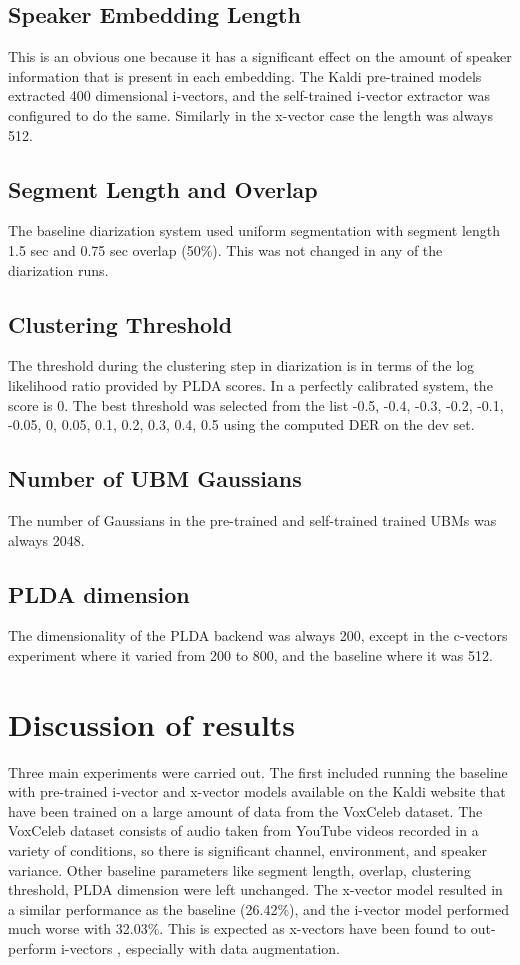 		\subsection{Speaker Embedding Length}
			This is an obvious one because it has a significant effect on the amount of speaker information that is present in each embedding. The Kaldi pre-trained models extracted 400 dimensional i-vectors, and the self-trained i-vector extractor was configured to do the same. Similarly in the x-vector case the length was always 512.
		\subsection{Segment Length and Overlap}
		The baseline diarization system used uniform segmentation with segment length 1.5 sec and 0.75 sec overlap (50\%). This was not changed in any of the diarization runs.
		\subsection{Clustering Threshold}
		The threshold during the clustering step in diarization is in terms of the log likelihood ratio provided by PLDA scores. In a perfectly calibrated system, the score is 0. The best threshold was selected from the list -0.5, -0.4, -0.3, -0.2, -0.1, -0.05, 0, 0.05, 0.1, 0.2, 0.3, 0.4, 0.5 using the computed DER on the dev set.
		\subsection{Number of UBM Gaussians}
		The number of Gaussians in the pre-trained and self-trained trained UBMs was always 2048.
		\subsection{PLDA dimension}
		The dimensionality of the PLDA backend was always 200, except in the c-vectors experiment where it varied from 200 to 800, and the baseline where it was 512.

	\section{Discussion of results}
		Three main experiments were carried out. The first included running the baseline with pre-trained i-vector and x-vector models available on the Kaldi website that have been trained on a large amount of data from the VoxCeleb dataset. The VoxCeleb dataset consists of audio taken from YouTube videos recorded in a variety of conditions, so there is significant channel, environment, and speaker variance. Other baseline parameters like segment length, overlap, clustering threshold, PLDA dimension were left unchanged. The x-vector model resulted in a similar performance as the baseline (26.42\%), and the i-vector model performed much worse with 32.03\%. This is expected as x-vectors have been found to out-perform i-vectors \cite{snyder2018x}, especially with data augmentation.
		
